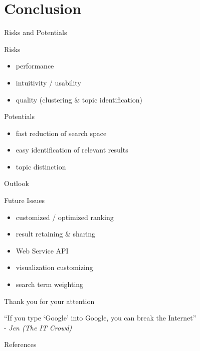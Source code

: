 \documentclass{beamer}
\begin{document}
\section{Conclusion}
\begin{frame}{Risks and Potentials}
	\begin{beamerboxesrounded}[shadow=true]{Risks}
		\begin{itemize}
			\item performance
			\item intuitivity / usability
			\item quality (clustering \& topic identification)
		\end{itemize}
	\end{beamerboxesrounded}	
	\vspace{5mm} \pause
	\begin{beamerboxesrounded}[shadow=true]{Potentials}
		\begin{itemize}
			\item fast reduction of search space
			\item easy identification of relevant results
			\item topic distinction
		\end{itemize}
	\end{beamerboxesrounded}	
\end{frame}

\begin{frame}{Outlook}
	\begin{beamerboxesrounded}[shadow=true]{Future Issues}
		\begin{itemize}
			\item customized / optimized ranking
			\item result retaining \& sharing
			\item Web Service API
			\item visualization customizing
			\item search term weighting
		\end{itemize}
	\end{beamerboxesrounded}	
\end{frame}

\begin{frame}
	\begin{beamerboxesrounded}[shadow=true]{Thank you for your attention}
		\begin{flushright}
			``If you type `Google' into Google, you can break the Internet'' \\
			- \textit{Jen (The IT Crowd)}
		\end{flushright}
	\end{beamerboxesrounded}	
\end{frame}

\begin{frame}[allowframebreaks]{References}
	\begin{tiny}
		
	\end{tiny}
\end{frame}
\end{document}
